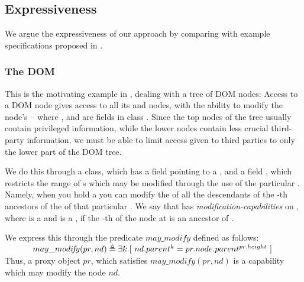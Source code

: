 \subsection{Expressiveness} 

\label{app:expressivity}

We argue the expressiveness of our approach by comparing with example specifications  proposed in \cite{OOPSLA22,dd,irisWasm23}.

 

\subsubsection{The DOM}  %
\label{ss:DOM}
This is the motivating example in \cite{dd},
dealing with a tree of DOM nodes: Access to a DOM node
gives access to all its  and  nodes, with the ability to
modify the node's  -- where  ,  and 
are fields in class . Since the top nodes of the tree
usually contain privileged information, while the lower nodes contain
less crucial third-party information, we must be able to limit 
 access given to third parties to only the lower part of the DOM tree. 
 
 We do this through a  class, which has a field  pointing to a , and a field , which restricts the range of s which may be modified through the use of the particular . Namely, when you hold a   you can modify the  of all the descendants of the    -th ancestors of the  of that particular .  
We say that 
 has \emph{modification-capabilities} on , where  is
a   and  is a , if the -th  
of the node at  is an ancestor of .

We express this through the predicate $may\_modify$ defined as follows:
\\
$\strut \SPSP   may\_modi\!f\!y(pr, nd) \triangleq \exists k. [ \  nd.parent^k=pr.node.parent^{pr.height}\ ]$
\\
Thus, a proxy object $pr$, which satisfies $may\_modi\!f\!y(pr,nd)$ is a capability which may modify the node $nd$. 


